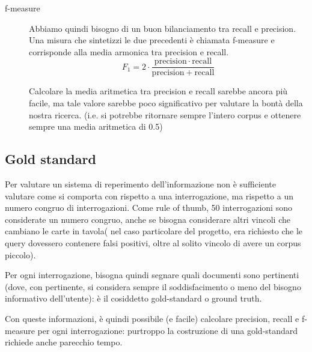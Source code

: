 \begin{description}
    \item[f-measure] Abbiamo quindi bisogno di un buon bilanciamento tra recall e precision. Una misura che sintetizzi le due precedenti è chiamata f-measure e corrisponde alla media armonica tra precision e recall. 
    \begin{equation}
        F_1 = 2 \cdot \frac{\mathrm{precision} \cdot \mathrm{recall}}{\mathrm{precision} + \mathrm{recall}}
    \end{equation}
    
    Calcolare la media aritmetica tra precision e recall sarebbe ancora più facile, ma tale valore sarebbe poco significativo per valutare la bontà della nostra ricerca. (i.e. si potrebbe ritornare sempre l'intero \gls{corpus} e ottenere sempre una media aritmetica di 0.5)
\end{description}


\FloatBarrier

\subsection{Gold standard} 
Per valutare un sistema di reperimento dell’informazione non è sufficiente valutare come si comporta con rispetto a una interrogazione, ma rispetto a un numero congruo di interrogazioni.
Come rule of thumb, 50 interrogazioni sono considerate un numero congruo, anche se bisogna considerare altri vincoli che cambiano le carte in tavola( nel caso particolare del progetto, era richiesto che le query dovessero contenere falsi positivi, oltre al solito vincolo di avere un \gls{corpus} piccolo).

Per ogni interrogazione, bisogna quindi segnare quali documenti sono pertinenti (dove, con pertinente, si considera sempre il soddisfacimento o meno del bisogno informativo dell’utente): è il cosiddetto \gls{gold-standard}\glsfirstoccur{} o ground truth.

Con queste informazioni, è quindi possibile (e facile) calcolare precision, recall e f-measure per ogni interrogazione: purtroppo la costruzione di una \gls{gold-standard} richiede anche parecchio tempo.

